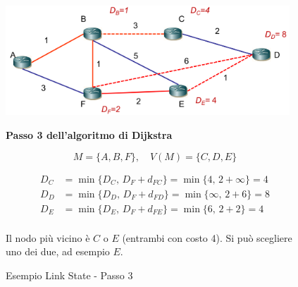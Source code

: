 \begin{figure}[h!]
    \begin{minipage}{0.5\textwidth}
        \centering
        \includegraphics[width=0.95\textwidth]{images/linkstate7.png}
        \caption{Esempio Link State - Passo 3}
        \label{fig:linkstate6}
    \end{minipage}\hfill
    \begin{minipage}{0.49\textwidth}
        \textbf{Passo 3 dell'algoritmo di Dijkstra}

        \[
        M = \{A, B, F\}, \quad V(M) = \{C, D, E\}
        \]

        \[
        \begin{aligned}
        D_C &= \min\{ D_C,\, D_F + d_{FC} \} = \min\{4,\, 2 + \infty\} = 4 \\
        D_D &= \min\{ D_D,\, D_F + d_{FD} \} = \min\{\infty,\, 2 + 6\} = 8 \\
        D_E &= \min\{ D_E,\, D_F + d_{FE} \} = \min\{6,\, 2 + 2\} = 4 \\
        \end{aligned}
        \]

        Il nodo più vicino è $C$ o $E$ (entrambi con costo 4). Si può scegliere uno dei due, ad esempio $E$.
    \end{minipage}
\end{figure}

\newpage

